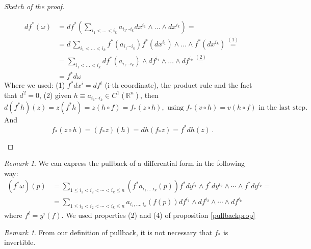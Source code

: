 \documentclass[a4paper,11pt,titlepage, article, oneside]{memoir}
\numberwithin{equation}{section}
\theoremstyle{definition}
\theoremstyle{remark}
\newtheorem{remark}[theorem]{Remark}
\newcommand{\rfield}{\mathbb{R}}
\begin{document}
\begin{proof}[Sketch of the proof]
\begin{enumerate}
\begin{align*}
df^*(\omega) &= df^* \left(\sum\limits_{i_1 < \ldots < i_k} a_{i_1 \cdots i_k} dx^{i_1} \wedge \ldots \wedge dx^{i_k} \right) = \\
&= d \, \sum\limits_{i_1 < \ldots < i_k} f^* (a_{i_1 \cdots i_k}) f^*(dx^{i_1}) \wedge \ldots \wedge f^*(dx^{i_k}) \overset{(1)}{=} \\
&=\sum\limits_{i_1 < \ldots < i_k} df^*(a_{i_1 \cdots i_k}) \wedge df^{i_1} \wedge \ldots \wedge df^{i_k} \overset{(2)}{=} \\
&= f^* d \omega
\end{align*}
Where we used: (1) $f^*dx^i = df^i$ (i-th coordinate), the product rule and the fact that $d^2 = 0$, (2) given $h \equiv a_{i_1 \cdots i_k} \in C^1(\rfield^n)$, then 
\[ d(f^* h)(z) = z(f^* h) = z(h \circ f) = f_* (z \circ h), \text{ using } f_*(v \circ h) = v(h \circ f) \text{ in the last step.} \]
And
\[ f_*(z \circ h) = (f_*z)(h) = dh(f_* z) = f^* dh(z) \, . \] \qedhere
\end{enumerate}
\end{proof}

\begin{remarkbox}\begin{remark} \label{effectivepullback}
We can express the pullback of a differential form in the following way:
\begin{align*}
(f^* \omega)(p) &= \sum\limits_{1 \le i_1 < i_2 < \cdots < i_k \le n} (f^*a_{i_1, \ldots i_k} (p)) f^*dy^{i_1} \wedge f^* dy^{i_2} \wedge \cdots \wedge f^* dy^{i_k} = \\
& = \sum\limits_{1 \le i_1 < i_2 < \cdots < i_k \le n} a_{i_1, \ldots, i_k} (f(p)) df^{i_1} \wedge df^{i_2} \wedge \cdots \wedge df^{i_k}
\end{align*}
where $f^i = y^i(f)$. We used properties (2) and (4) of proposition \ref{pullbackprop}
\end{remark}\end{remarkbox}

\begin{remarkbox}\begin{remark}
  From our definition of pullback, it is not necessary that $f_*$ is invertible.
\end{remark}\end{remarkbox}
\end{document}
